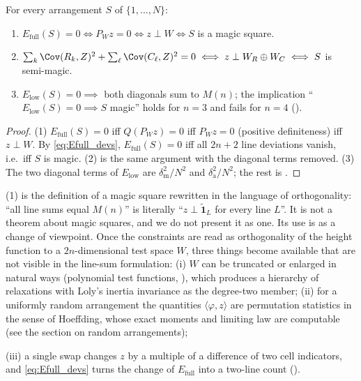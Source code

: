 \begin{lemma}
\label{lem:zero_set}
For every arrangement $S$ of $\{1,\dots,N\}$:
\begin{enumerate}
\item $E_{\mathrm{full}}(S)=0\iff P_Wz=0\iff z\perp W\iff S$ is a magic square.
\item $\sum_k\Cov(R_k,Z)^{2}+\sum_\ell\Cov(C_\ell,Z)^{2}=0\iff z\perp W_R\oplus W_C\iff S$ is semi-magic.
\item $E_{\mathrm{low}}(S)=0\implies$ both diagonals sum to $M(n)$; the implication
``$E_{\mathrm{low}}(S)=0\implies S$ magic'' holds for $n=3$ and fails for $n=4$ ().
\end{enumerate}
\end{lemma}

\begin{proof}
(1) $E_{\mathrm{full}}(S)=0$ iff $Q(P_Wz)=0$ iff $P_Wz=0$ (positive definiteness) iff $z\perp W$.
By \eqref{eq:Efull_devs}, $E_{\mathrm{full}}(S)=0$ iff all $2n+2$ line deviations vanish, i.e.\ iff $S$ is magic.
(2) is the same argument with the diagonal terms removed.  (3) The two diagonal terms of $E_{\mathrm{low}}$
are $\delta_{\mathrm m}^{2}/N^{2}$ and $\delta_{\mathrm a}^{2}/N^{2}$; the rest is .
\end{proof}

\begin{remark}
\label{rem:tautology}
(1) is the definition of a magic square rewritten in the language of orthogonality:
``all line sums equal $M(n)$'' is literally ``$z\perp\tilde{\mathbf 1}_L$ for every line $L$''.  It is not a
theorem about magic squares, and we do not present it as one.  Its use is as a change of viewpoint.
Once the constraints are read as orthogonality of the height function to a $2n$-dimensional test space $W$,
three things become available that are not visible in the line-sum formulation:
(i) $W$ can be truncated or enlarged in natural ways (polynomial test functions, ),
which produces a hierarchy of relaxations with Loly's inertia invariance as the degree-two member;
(ii) for a uniformly random arrangement the quantities $\langle\varphi,z\rangle$ are permutation statistics in
the sense of Hoeffding, whose exact moments and limiting law are computable (see the section on random arrangements);%

(iii) a single swap changes $z$ by a multiple of a difference of two cell indicators, and \eqref{eq:Efull_devs}
turns the change of $E_{\mathrm{full}}$ into a two-line count ().
\end{remark}

